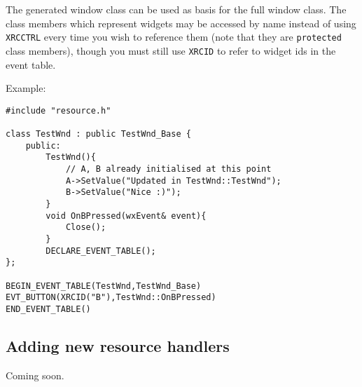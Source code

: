 The generated window class can be used as basis for the full window class. The
class members which represent widgets may be accessed by name instead of using
{\tt XRCCTRL} every time you wish to reference them (note that they are {\tt protected} class members), 
though you must still use {\tt XRCID} to refer to widget ids in the event
table. 

Example:

\begin{verbatim}
#include "resource.h"

class TestWnd : public TestWnd_Base {
	public:
		TestWnd(){
			// A, B already initialised at this point
			A->SetValue("Updated in TestWnd::TestWnd");
			B->SetValue("Nice :)");
		}
		void OnBPressed(wxEvent& event){
			Close();
		}
		DECLARE_EVENT_TABLE();
};

BEGIN_EVENT_TABLE(TestWnd,TestWnd_Base)
EVT_BUTTON(XRCID("B"),TestWnd::OnBPressed)
END_EVENT_TABLE()

\end{verbatim}

\subsection{Adding new resource handlers}\label{newresourcehandlers}

Coming soon.

